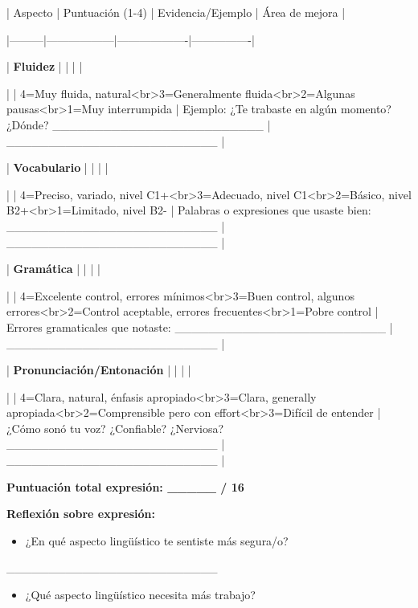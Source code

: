\documentclass[a4paper,11pt]{article}
\begin{document}
| Aspecto | Puntuación (1-4) | Evidencia/Ejemplo | Área de mejora |

|---------|------------------|-------------------|----------------|

| \textbf{Fluidez} | | | |

| | 4=Muy fluida, natural<br>3=Generalmente fluida<br>2=Algunas pausas<br>1=Muy interrumpida | Ejemplo: ¿Te trabaste en algún momento? ¿Dónde? _________________________ | _________________________ |

| \textbf{Vocabulario} | | | |

| | 4=Preciso, variado, nivel C1+<br>3=Adecuado, nivel C1<br>2=Básico, nivel B2+<br>1=Limitado, nivel B2- | Palabras o expresiones que usaste bien: _________________________ | _________________________ |

| \textbf{Gramática} | | | |

| | 4=Excelente control, errores mínimos<br>3=Buen control, algunos errores<br>2=Control aceptable, errores frecuentes<br>1=Pobre control | Errores gramaticales que notaste: _________________________ | _________________________ |

| \textbf{Pronunciación/Entonación} | | | |

| | 4=Clara, natural, énfasis apropiado<br>3=Clara, generally apropiada<br>2=Comprensible pero con effort<br>3=Difícil de entender | ¿Cómo sonó tu voz? ¿Confiable? ¿Nerviosa? _________________________ | _________________________ |

\vspace{0.2cm}

\textbf{Puntuación total expresión: _____ / 16}

\vspace{0.2cm}

\textbf{Reflexión sobre expresión:}

\begin{itemize}

  \item ¿En qué aspecto lingüístico te sentiste más segura/o?

\end{itemize}

_________________________

\begin{itemize}

  \item ¿Qué aspecto lingüístico necesita más trabajo?

\end{itemize}
\end{document}
